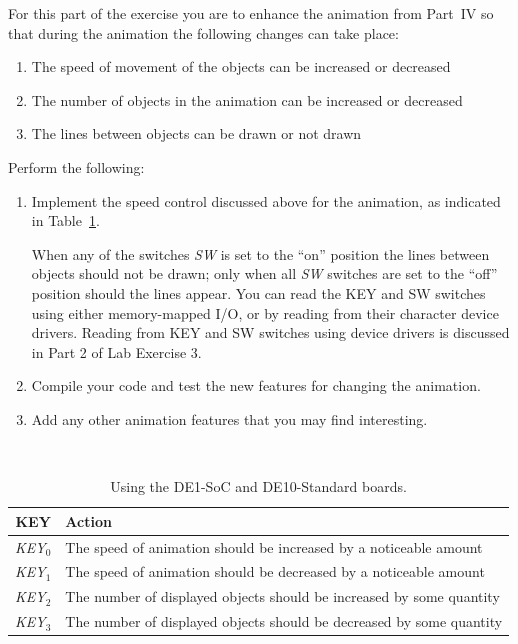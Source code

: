 \documentclass[epsfig,10pt,fullpage]{article}
\begin{document}
\noindent
For this part of the exercise you are to enhance the animation from Part~IV so that
during the animation the following changes can take place:

\begin{enumerate}
\item
The speed of movement of the objects can be increased or decreased
\item
The number of objects in the animation can be increased or decreased
\item
The lines between objects can be drawn or not drawn
\end{enumerate}

\noindent
Perform the following:

\begin{enumerate}

\item Implement the speed control discussed above for the animation, as indicated 
in Table~\ref{tab:action1}.

When any of the switches {\it SW} is set to the ``on'' position the lines between objects should 
not be drawn; only when all {\it SW} switches are set to the ``off'' position should the 
lines appear. You can read the KEY and SW switches using either memory-mapped I/O, or 
by reading from their character device drivers. Reading from KEY and SW switches using
device drivers is discussed in Part 2 of Lab Exercise 3.

\item Compile your code and test the new features for changing the animation.

\item Add any other animation features that you may find interesting.
\end{enumerate}

\begin{table}[h]
\caption{Using the DE1-SoC and DE10-Standard boards.}
~\\
\centering
\label{tab:action1}
\begin{tabular}{c|p{13cm}}
{\bf KEY} & {\bf Action} \\ \hline
\rule{0cm}{12pt}{\it KEY}$_0$ & The speed of animation should be increased by a noticeable amount\\
{\it KEY}$_1$ & The speed of animation should be decreased by a noticeable amount \\
{\it KEY}$_2$ & The number of displayed objects should be increased by some quantity \\
{\it KEY}$_3$ & The number of displayed objects should be decreased by some quantity \\
\end{tabular}
\end{table}
\end{document}

